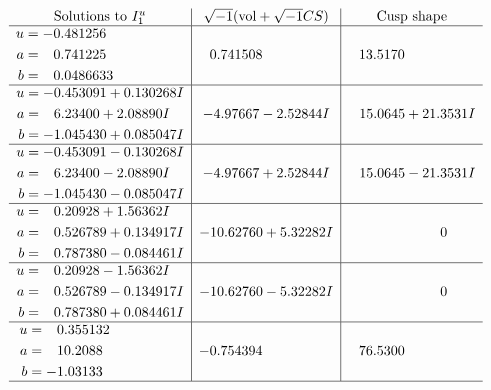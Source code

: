 \documentclass[1p]{elsarticle_modified}
\theoremstyle{definition}
\newcommand{\I}{\sqrt{-1}}
\begin{document}
$$\begin{array}{c|c|c}
\text{Solutions to }I^u_{1}& \I (\text{vol} + \sqrt{-1}CS) & \text{Cusp shape}\\
 \hline 
\begin{aligned}
u &= -0.481256\phantom{ +0.000000I} \\
a &= \phantom{-}0.741225\phantom{ +0.000000I} \\
b &= \phantom{-}0.0486633\phantom{ +0.000000I}\end{aligned}
 & \phantom{-}0.741508\phantom{ +0.000000I} & \phantom{-}13.5170\phantom{ +0.000000I} \\ \hline\begin{aligned}
u &= -0.453091 + 0.130268 I \\
a &= \phantom{-}6.23400 + 2.08890 I \\
b &= -1.045430 + 0.085047 I\end{aligned}
 & -4.97667 - 2.52844 I & \phantom{-}15.0645 + 21.3531 I \\ \hline\begin{aligned}
u &= -0.453091 - 0.130268 I \\
a &= \phantom{-}6.23400 - 2.08890 I \\
b &= -1.045430 - 0.085047 I\end{aligned}
 & -4.97667 + 2.52844 I & \phantom{-}15.0645 - 21.3531 I \\ \hline\begin{aligned}
u &= \phantom{-}0.20928 + 1.56362 I \\
a &= \phantom{-}0.526789 + 0.134917 I \\
b &= \phantom{-}0.787380 - 0.084461 I\end{aligned}
 & -10.62760 + 5.32282 I & \phantom{-0.000000 } 0 \\ \hline\begin{aligned}
u &= \phantom{-}0.20928 - 1.56362 I \\
a &= \phantom{-}0.526789 - 0.134917 I \\
b &= \phantom{-}0.787380 + 0.084461 I\end{aligned}
 & -10.62760 - 5.32282 I & \phantom{-0.000000 } 0 \\ \hline\begin{aligned}
u &= \phantom{-}0.355132\phantom{ +0.000000I} \\
a &= \phantom{-}10.2088\phantom{ +0.000000I} \\
b &= -1.03133\phantom{ +0.000000I}\end{aligned}
 & -0.754394\phantom{ +0.000000I} & \phantom{-}76.5300\phantom{ +0.000000I}\\
 \hline 
 \end{array}$$\newpage\newpage\renewcommand{\arraystretch}{1}
\end{document}

